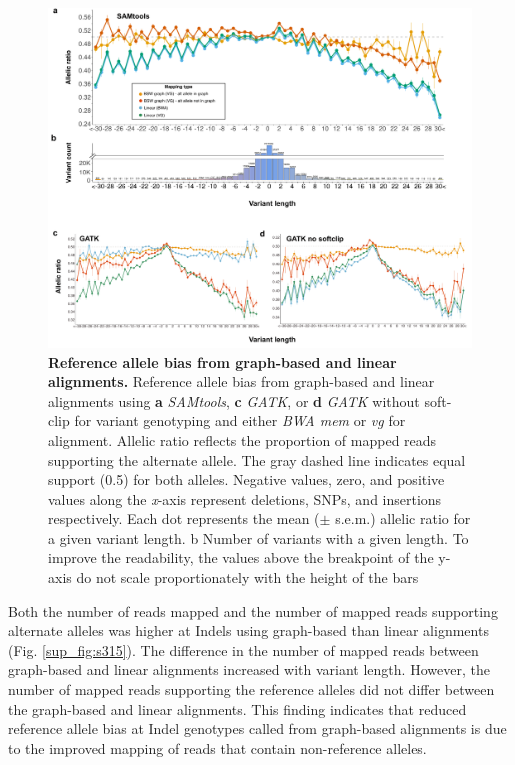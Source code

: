 \documentclass[../main.tex]{subfiles}
\begin{document}
\begin{figure}[!htb]
    \centering
    \includegraphics[width=\textwidth]{paper2/main_figure/Fig7.pdf}
    \caption[Reference allele bias from graphs]{\textbf{Reference allele bias from graph-based and linear alignments.} 
    \small{Reference allele bias from graph-based and linear alignments using \textbf{a} \emph{SAMtools}, \textbf{c} \emph{GATK}, or \textbf{d} \emph{GATK} without soft-clip for variant genotyping and either \emph{BWA mem} or \emph{vg} for alignment. Allelic ratio reflects the proportion of mapped reads supporting the alternate allele. The gray dashed line indicates equal support (0.5) for both alleles. Negative values, zero, and positive values along the \emph{x}-axis represent deletions, SNPs, and insertions respectively. Each dot represents the mean ($\pm$ s.e.m.) allelic ratio for a given variant length. b Number of variants with a given length. To improve the readability, the values above the breakpoint of the y-axis do not scale proportionately with the height of the bars}}
    \label{fig37:bias}
\end{figure}

Both the number of reads mapped and the number of mapped reads supporting alternate alleles was higher at Indels using graph-based than linear alignments (Fig. \ref{sup_fig:s315}). The difference in the number of mapped reads between graph-based and linear alignments increased with variant length. However, the number of mapped reads supporting the reference alleles did not differ between the graph-based and linear alignments. This finding indicates that reduced reference allele bias at Indel genotypes called from graph-based alignments is due to the improved mapping of reads that contain non-reference alleles.
\end{document}
